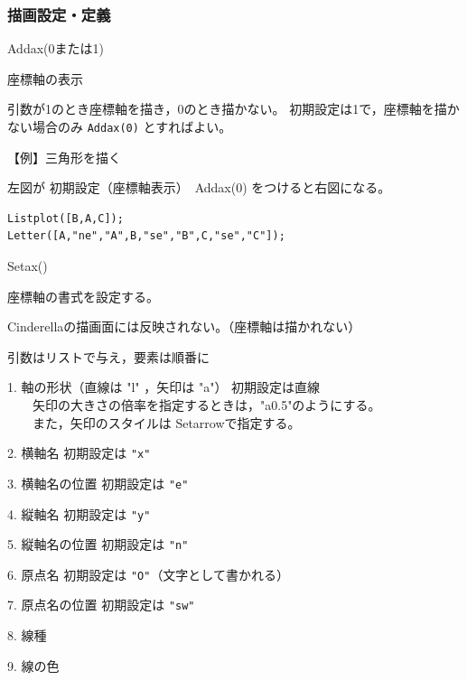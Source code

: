 \documentclass[papersize,a4paper,12pt,uplatex]{jsarticle}
\begin{document}
\subsubsection{描画設定・定義}

\vspace{\baselineskip}
\begin{description}
\hypertarget{addax}{}
\item[関数]Addax(0または1)
\item[機能]座標軸の表示
\item[説明]引数が1のとき座標軸を描き，0のとき描かない。
初期設定は1で，座標軸を描かない場合のみ \verb|Addax(0)| とすればよい。

\vspace{\baselineskip}
【例】三角形を描く

左図が 初期設定（座標軸表示）　Addax(0) をつけると右図になる。

\begin{verbatim}
Listplot([B,A,C]);
Letter([A,"ne","A",B,"se","B",C,"se","C"]);
\end{verbatim}

\vspace{\baselineskip}
\hspace{10mm} 


\hypertarget{setax}{}
\item[関数]Setax()
\item[機能]座標軸の書式を設定する。
\item[説明]Cinderellaの描画面には反映されない。（座標軸は描かれない）

引数はリストで与え，要素は順番に

1. 軸の形状（直線は "l" ，矢印は "a"） 初期設定は直線\\
　　矢印の大きさの倍率を指定するときは，"a0.5"のようにする。\\
　　また，矢印のスタイルは Setarrowで指定する。

2. 横軸名 初期設定は \verb|"x"|

3. 横軸名の位置 初期設定は \verb|"e"|

4. 縦軸名 初期設定は \verb|"y"|

5. 縦軸名の位置 初期設定は \verb|"n"|

6. 原点名 初期設定は \verb|"O"|（文字として書かれる）

7. 原点名の位置 初期設定は \verb|"sw"|

8. 線種

9. 線の色


\end{description}
\end{document}
